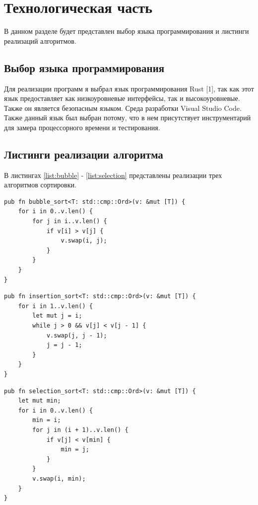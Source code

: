 \documentclass[14pt,russian]{scrartcl}
\begin{document}
\section{Технологическая часть}

В данном разделе будет представлен выбор языка программирования и листинги реализаций алгоритмов.

\subsection{Выбор языка программирования}
Для реализации программ я выбрал язык программирования Rust [1], так как этот язык предоставляет как низкоуровневые интерфейсы, так и высокоуровневые. Также он является безопасным языком. Среда разработки Visual Studio Code. Также данный язык был выбран потому, что в нем присутствует инструментарий для замера процессорного времени и тестирования.

\subsection{Листинги реализации алгоритма}

В листингах \ref{list:bubble} - \ref{list:selection} представлены реализации трех алгоритмов сортировки.

\begin{lstlisting}[label=list:bubble, caption=Функция сортировки массива методом пузырька]
pub fn bubble_sort<T: std::cmp::Ord>(v: &mut [T]) {
    for i in 0..v.len() {
        for j in i..v.len() {
            if v[i] > v[j] {
                v.swap(i, j);
            }
        }
    }
}
\end{lstlisting}

\begin{lstlisting}[label=list:insertion, caption=Функция сортировки массива методом вставок]
pub fn insertion_sort<T: std::cmp::Ord>(v: &mut [T]) {
    for i in 1..v.len() {
        let mut j = i;
        while j > 0 && v[j] < v[j - 1] {
            v.swap(j, j - 1);
            j = j - 1;
        }
    }
}
\end{lstlisting}

\begin{lstlisting}[label=list:selection, caption=Функция сортировки массива методом выбора]
pub fn selection_sort<T: std::cmp::Ord>(v: &mut [T]) {
    let mut min;
    for i in 0..v.len() {
        min = i;
        for j in (i + 1)..v.len() {
            if v[j] < v[min] {
                min = j;
            }
        }
        v.swap(i, min);
    }
}
\end{lstlisting}
\end{document}
